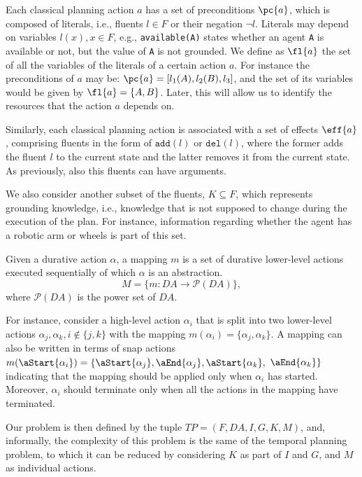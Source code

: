 Each classical planning action $a$ has a set of preconditions $\pc{a}$, which is composed of literals, i.e., fluents $l\in F$ or their negation $\lnot l$. Literals may depend on variables $l(x), x\in F$, e.g., \texttt{available(A)} states whether an agent \texttt{A} is available or not, but the value of \texttt{A} is not grounded. We define as $\fl{a}$ the set of all the variables of the literals of a certain action $a$. For instance the preconditions of $a$ may be: $\pc{a}=[l_1(A), l_2(B), l_3]$, and the set of its variables would be given by $\fl{a}=\{A,B\}$. Later, this will allow us to identify the resources that the action $a$ depends on. 

Similarly, each classical planning action is associated with a set of effects $\eff{a}$, comprising fluents in the form of $\texttt{add}(l)$ or $\texttt{del}(l)$, where the former adds the fluent $l$ to the current state and the latter removes it from the current state. As previously, also this fluents can have arguments.

We also consider another subset of the fluents, $K\subseteq F$, which represents grounding knowledge, i.e., knowledge that is not supposed to change during the execution of the plan. For instance, information regarding whether the agent has a robotic arm or wheels is part of this set. 

\begin{definition}[Mapping]
Given a durative action $\alpha$, a mapping $m$ is a set of durative lower-level actions executed sequentially of which $\alpha$ is an abstraction.
\[ M = \{m : DA \rightarrow \mathcal{P}(DA)\},\]
where $\mathcal{P}(DA)$ is the power set of $DA$.
\end{definition}

For instance, consider a high-level action $\alpha_i$ that is split into two lower-level actions $\alpha_j, \alpha_k, i\notin \{j, k\}$ with the mapping $m(\alpha_i) = \{\alpha_j, \alpha_k\}$. A mapping can also be written in terms of snap actions $m(\aStart{\alpha_i}) = \{\aStart{\alpha_j}, \aEnd{\alpha_j}, \aStart{\alpha_k},$ $\aEnd{\alpha_k}\}$ indicating that the mapping should be applied only when $\alpha_i$ has started. Moreover, $\alpha_i$ should terminate only when all the actions in the mapping have terminated. 

Our problem is then defined by the tuple $TP=(F, DA, I, G, K, M)$, and, informally, the complexity of this problem is the same of the temporal planning problem, to which it can be reduced by considering $K$ as part of $I$ and $G$, and $M$ as individual actions. 

